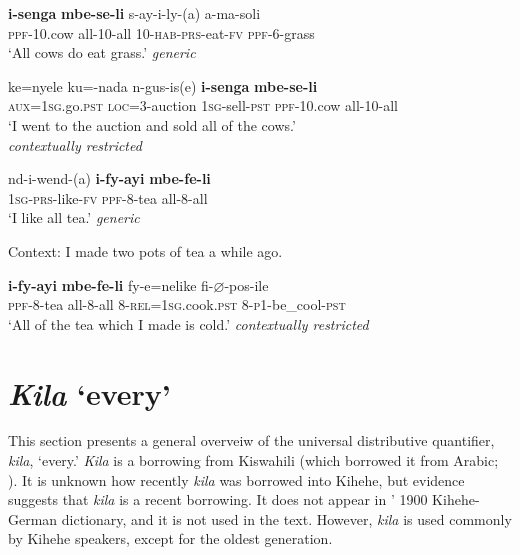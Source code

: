 \documentclass[letterpaper, 12pt]{article}
\let\emptyset\varnothing
\begin{document}
\begin{exe} 
\singlespacing
\ex \label{partitive} \begin{xlist} \label{eatgrass}

\ex \gll \textbf{i-senga} \textbf{mbe-se-li} s-ay-i-ly-(a) a-ma-soli \\
\textsc{ppf}-10.cow all-10-all 10-\textsc{hab}-\textsc{prs}-eat-\textsc{fv} \textsc{ppf}-6-grass \\
`All cows do eat grass.' \hfill{\emph{generic}}
\vspace{5mm}

\ex \gll ke=nyele ku=-nada n-gus-is(e) \textbf{i-senga} \textbf{mbe-se-li} \\
\textsc{aux}=\textsc{1sg}.go.\textsc{pst} \textsc{loc}=3-auction \textsc{1sg}-sell-\textsc{pst} \textsc{ppf}-10.cow all-10-all \\
`I went to the auction and sold all of the cows.' \\ \hfill{\emph{contextually restricted}}  
\end{xlist}
\end{exe}

\begin{exe}
\singlespacing
\ex \begin{xlist} \label{drinktea}

\ex \gll nd-i-wend-(a) \textbf{i-fy-ayi} \textbf{mbe-fe-li} \\
\textsc{1sg}-\textsc{prs}-like-\textsc{fv} \textsc{ppf}-8-tea all-8-all \\
`I like all tea.' \hfill{\emph{generic}}

\vspace{5mm}

\ex Context: I made two pots of tea a while ago.

\gll \textbf{i-fy-ayi} \textbf{mbe-fe-li} fy-e=nelike fi-$\emptyset$-pos-ile \\
\textsc{ppf}-8-tea all-8-all 8-\textsc{rel}=\textsc{1sg}.cook.\textsc{pst} 8-\textsc{p1}-be\_cool-\textsc{pst} \\
`All of the tea which I made is cold.' \hfill{\emph{contextually restricted}}

\end{xlist}
\end{exe}



\section{\emph{Kila} `every'} \label{sectionevery}
This section presents a general overveiw of the universal distributive quantifier, \textit{kila}, `every.' \textit{Kila} is a borrowing from Kiswahili (which borrowed it from Arabic; ). It is unknown how recently \textit{kila} was borrowed into Kihehe, but evidence suggests that \textit{kila} is a recent borrowing. It does not appear in \citeauthor{spiss1900}' 1900 Kihehe-German dictionary, and it is not used in the \citeauthor{luwuko} text. However, \textit{kila} is used commonly by Kihehe speakers, except for the oldest generation.
\end{document}
